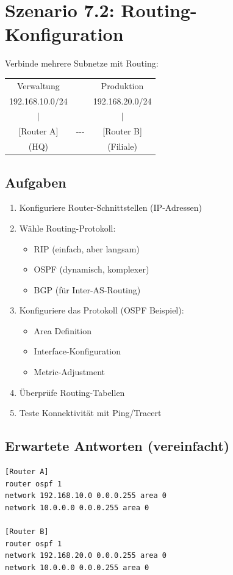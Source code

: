 \documentclass[12pt,a4paper,german]{report}
\begin{document}
\section{Szenario 7.2: Routing-Konfiguration}

Verbinde mehrere Subnetze mit Routing:

\begin{center}
\begin{tabular}{ccc}
Verwaltung & & Produktion \\
192.168.10.0/24 & & 192.168.20.0/24 \\
$|$ & & $|$ \\
{[}Router A{]} & {-}{-}{-} & {[}Router B{]} \\
(HQ) & & (Filiale)
\end{tabular}
\end{center}

\subsection{Aufgaben}
\begin{enumerate}
    \item Konfiguriere Router-Schnittstellen (IP-Adressen)
    \item Wähle Routing-Protokoll:
    \begin{itemize}
        \item RIP (einfach, aber langsam)
        \item OSPF (dynamisch, komplexer)
        \item BGP (für Inter-AS-Routing)
    \end{itemize}
    \item Konfiguriere das Protokoll (OSPF Beispiel):
    \begin{itemize}
        \item Area Definition
        \item Interface-Konfiguration
        \item Metric-Adjustment
    \end{itemize}
    \item Überprüfe Routing-Tabellen
    \item Teste Konnektivität mit Ping/Tracert
\end{enumerate}

\subsection{Erwartete Antworten (vereinfacht)}
\begin{lstlisting}[language=bash]
[Router A]
router ospf 1
network 192.168.10.0 0.0.0.255 area 0
network 10.0.0.0 0.0.0.255 area 0

[Router B]
router ospf 1
network 192.168.20.0 0.0.0.255 area 0
network 10.0.0.0 0.0.0.255 area 0
\end{lstlisting}
\end{document}
